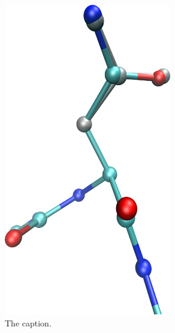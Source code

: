 \begin{figure}[h]
  \centering
  \includegraphics[width=0.65\textwidth,height=0.3\textheight,keepaspectratio]{figures/mutation_side_chain_images/1brs_chain_a_resid_58.png}
  \caption{The caption.}
  \label{figure:computational_mutation_scanning/figname}
\end{figure}

